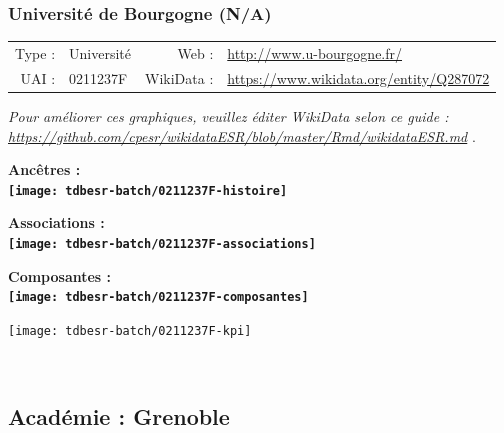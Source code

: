 \documentclass[12pt,french,]{article}
\begin{document}
\hypertarget{universituxe9-de-bourgogne-na}{%
\subsubsection{Université de Bourgogne
(N/A)}\label{universituxe9-de-bourgogne-na}}

\begin{tabular*}{\textwidth}{rp{5cm}rl}  
\hline  
Type : & Université & Web : &\href{http://www.u-bourgogne.fr/}{http://www.u-bourgogne.fr/} \\  
UAI : & 0211237F & WikiData : & \href{https://www.wikidata.org/entity/Q287072}{https://www.wikidata.org/entity/Q287072} \\  
\hline  
\end{tabular*}

\textit{\scriptsize Pour améliorer ces graphiques, veuillez éditer WikiData selon ce guide :  \href{https://github.com/cpesr/wikidataESR/blob/master/Rmd/wikidataESR.md}{https://github.com/cpesr/wikidataESR/blob/master/Rmd/wikidataESR.md}}
.

\vspace{1cm}  
\begin{minipage}[b]{0.50\textwidth}\begin{center} \bf Ancêtres : \\  
\texttt{[image: tdbesr-batch/0211237F-histoire]} \end{center}\end{minipage}\begin{minipage}[b]{0.50\textwidth}\begin{center} \bf Associations : \\  
\texttt{[image: tdbesr-batch/0211237F-associations]} \end{center}\end{minipage}

\hrulefill

\begin{center} \bf Composantes : \\  
\texttt{[image: tdbesr-batch/0211237F-composantes]} \end{center}

\begin{center}\texttt{[image: tdbesr-batch/0211237F-kpi]} \end{center}\checkoddpage

\ifoddpage \fi ~\newpage  

\hypertarget{acaduxe9mie-grenoble}{%
\subsection{Académie : Grenoble}\label{acaduxe9mie-grenoble}}
\end{document}

